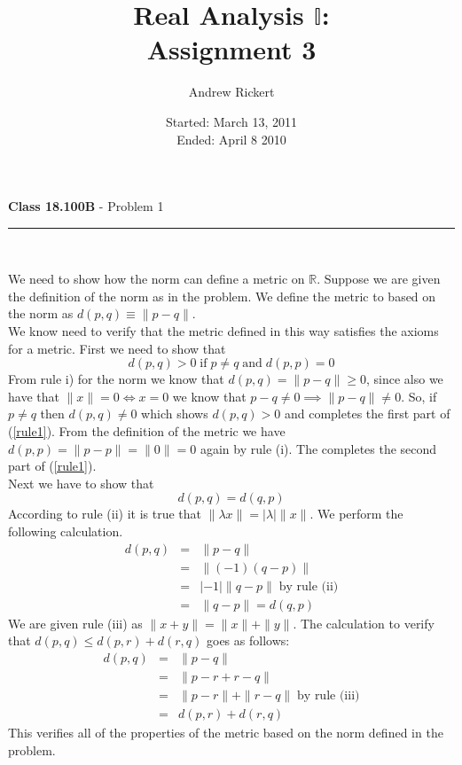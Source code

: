 \documentclass[11pt,reqno]{article}
\title{Real Analysis $\mathbb{I}$: \\ Assignment 3}
\author{Andrew Rickert}
\date{Started: March 13, 2011 \\ \hspace{1pt} Ended: April 8  2010}                                           %
\begin{document}
\maketitle


\begin{flushleft} 
\textbf{Class 18.100B} - Problem 1\\
\rule{500pt}{1pt}\\
\end{flushleft} 

We need to show how the norm can define a metric on $\mathbb{R}$. Suppose we are given the definition of the norm as in the problem. We define the metric to based on the norm as $d(p,q) \equiv \|p-q\|$.\\
\indent We know need to verify that the metric defined in this way satisfies the axioms for a metric.
First we need to show that 
\begin{equation}
d(p,q) > 0 \; \text{if} \; p \neq q \; \text{and} \; d(p,p) = 0 \label{rule1}
\end{equation} 
From rule i) for the norm we know that $d(p,q) = \|p-q\| \ge 0$,  since also we have that $\|x\| = 0 \iff x = 0$ we know that $p-q \ne 0 \implies \|p-q\| \neq 0$. So, if $p \neq q$ then $d(p,q) \neq 0$ which shows $d(p,q) > 0$ and completes the first part of (\ref{rule1}). From the definition of the metric we have $d(p,p) = \|p - p\| = \| 0 \| = 0$ again by rule (i). The completes the second part of (\ref{rule1}).\\
\indent Next we have to show that 
\begin{equation}
d(p,q) = d(q,p) \label{rule2}
\end{equation} 
According to rule (ii) it is true that $\| \lambda x \| = |\lambda| \|x \|$. We perform the following calculation.
\begin{eqnarray*}
d(p,q) & = & \| p - q \| \\
            & = & \| (-1) (q - p) \| \\
            & = & |-1| \|q - p\| \; \text{by rule (ii)} \\
            & = & \| q - p \| = d(q,p)
\end{eqnarray*}
We are given rule (iii) as $\| x+ y \| =  \| x \|  +  \| y \|$. The calculation to verify that $d(p,q) \le d(p,r) + d(r,q)$ goes as follows:
\begin{eqnarray*}
d(p,q) & = & \| p - q \| \\
	  & = & \| p - r + r - q \| \\
	  & = & \| p - r \| + \| r - q \| \; \text{by rule (iii)} \\
	  & = & d(p,r) + d(r,q)
\end{eqnarray*}
This verifies all of the properties of the metric based on the norm defined in the problem.
\end{document}
